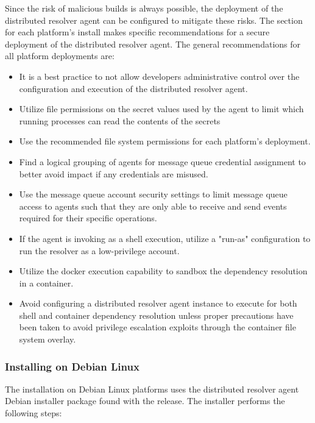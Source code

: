 Since the risk of malicious builds is always possible, the deployment of the distributed resolver agent
can be configured to mitigate these risks.  The section for each platform's install makes specific
recommendations for a secure deployment of the distributed resolver agent.  The general recommendations
for all platform deployments are:

\begin{itemize}
  \item It is a best practice to not allow developers administrative control over the configuration and
    execution of the distributed resolver agent.
  \item Utilize file permissions on the secret values used by the agent to limit which running processes
    can read the contents of the secrets
  \item Use the recommended file system permissions for each platform's deployment.
  \item Find a logical grouping of agents for message queue credential assignment to better avoid
    impact if any credentials are misused.
  \item Use the message queue account security settings to limit message queue access to agents such that they are only
    able to receive and send events required for their specific operations.
  \item If the agent is invoking \scaresolver as a shell execution, utilize a "run-as" configuration to
    run the resolver as a low-privilege account.
  \item Utilize the \scaresolver docker execution capability to sandbox the dependency resolution in a container.
  \item Avoid configuring a distributed resolver agent instance to execute \scaresolver for both shell and container dependency resolution
    unless proper precautions have been taken to avoid privilege escalation exploits through the container file system overlay.
\end{itemize}



\subsubsection{Installing on Debian Linux}

The installation on Debian Linux platforms uses the distributed resolver agent Debian installer package
found with the \cxoneflow release.  The installer performs the following steps:

